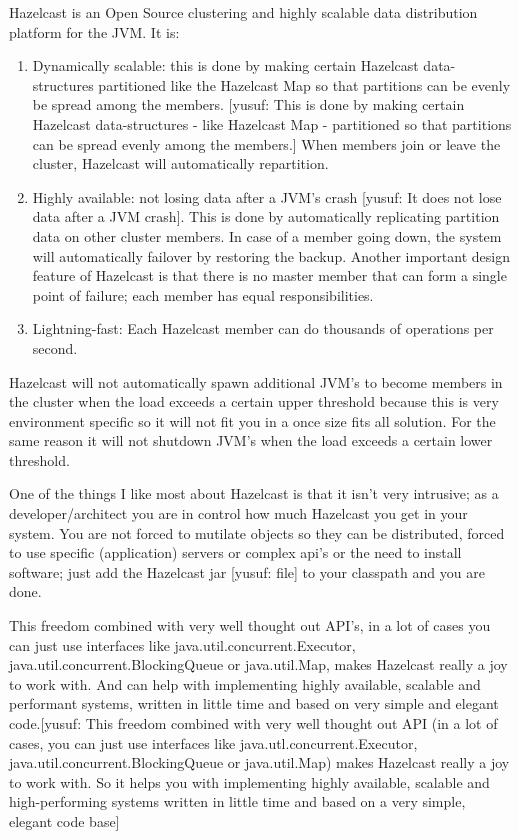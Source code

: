 Hazelcast is an Open Source clustering and highly scalable data distribution platform for the JVM. It is:
\begin{enumerate}
\item Dynamically scalable: this is done by making certain Hazelcast data-structures partitioned like the Hazelcast Map so that partitions can be evenly be spread among the members.  [yusuf: This is done by making certain Hazelcast data-structures - like Hazelcast Map - partitioned so that partitions can be spread evenly among the members.] When members join or leave the cluster, Hazelcast will automatically repartition.
\item Highly available: not losing data after a JVM's crash [yusuf: It does not lose data after a JVM crash]. This is done by automatically replicating partition data on other cluster members. In case of a member going down, the system will automatically failover by restoring the backup. Another important design feature of Hazelcast is that there is no master member that can form a single point of failure; each member has equal responsibilities.
\item Lightning-fast: Each Hazelcast member can do thousands of operations per second.
\end{enumerate}
Hazelcast will not automatically spawn additional JVM's to become members in the cluster when the load exceeds a certain upper threshold because this is very environment specific so it will not fit you in a once size fits all solution. For the same reason it will not shutdown JVM's when the load exceeds a certain lower threshold.

One of the things I like most about Hazelcast is that it isn't very intrusive; as a developer/architect you are in control how much Hazelcast you get in your system. You are not forced to mutilate objects so they can be distributed, forced to use specific (application) servers or complex api's or the need to install software; just add the Hazelcast jar [yusuf: file] to your classpath and you are done.

This freedom combined with very well thought out API's, in a lot of cases you can just use interfaces like java.util.concurrent.Executor, java.util.concurrent.BlockingQueue or java.util.Map, makes Hazelcast really a joy to work with. And can help with implementing highly available, scalable and performant systems, written in little time and based on very simple and elegant code.[yusuf: This freedom combined with very well thought out API (in a lot of cases, you can just use interfaces like java.utl.concurrent.Executor, java.util.concurrent.BlockingQueue or java.util.Map) makes Hazelcast really a joy to work with. So it helps you with implementing highly available, scalable and high-performing systems written in little time and based on a very simple, elegant code base]
 
